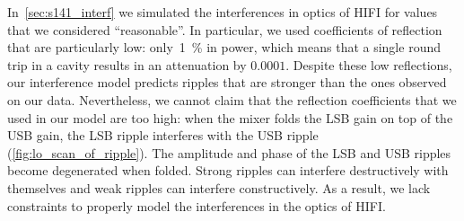 In~\cref{sec:s141_interf} we simulated the interferences in optics of HIFI for values that we considered ``reasonable''.
In particular, we used coefficients of reflection that are particularly low: only~\SI{1}{\percent} in power, which means that a single round trip in a cavity results in an attenuation by $0.0001$.
Despite these low reflections, our interference model predicts ripples that are stronger than the ones observed on our data.
Nevertheless, we cannot claim that the reflection coefficients that we used in our model are too high:
when the mixer folds the LSB gain on top of the USB gain, the LSB ripple interferes with the USB ripple (\cref{fig:lo_scan_of_ripple}).
The amplitude and phase of the LSB and USB ripples become degenerated when folded.
Strong ripples can interfere destructively with themselves and weak ripples can interfere constructively.
As a result, we lack constraints to properly model the interferences in the optics of HIFI.



